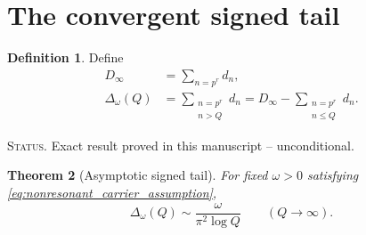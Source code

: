 \documentclass[11pt]{amsart}
\numberwithin{equation}{section}
\theoremstyle{plain}
\newtheorem{theorem}{Theorem}[section]
\theoremstyle{definition}
\newtheorem{definition}[theorem]{Definition}
\theoremstyle{remark}
\newcommand{\1}{\mathbf{1}}
\newcommand{\statusnote}[1]{%
  \par\smallskip\noindent
  \begingroup\footnotesize\textsc{Status.} #1\endgroup
  \par\smallskip}
\begin{document}
\section{The convergent signed tail}
\label{sec:signed_tail}

\begin{definition}
\label{def:Delta}
Define
\begin{align}
D_\infty
&=
\sum_{n=p^r}d_n,
\label{eq:D_infinity}
\\
\Delta_\omega(Q)
&=
\sum_{\substack{n=p^r\\n>Q}}d_n
=
D_\infty-\sum_{\substack{n=p^r\\n\leq Q}}d_n.
\label{eq:Delta_definition}
\end{align}
\end{definition}

\statusnote{Exact result proved in this manuscript -- unconditional.}
\begin{theorem}[Asymptotic signed tail]
\label{thm:Delta_asymptotic}
For fixed \(\omega>0\) satisfying
\eqref{eq:nonresonant_carrier_assumption},
\begin{equation}
\boxed{
\Delta_\omega(Q)
\sim
\frac{\omega}{\pi^2\log Q}
\qquad(Q\to\infty).
}
\label{eq:Delta_asymptotic}
\end{equation}
\end{theorem}
\end{document}
